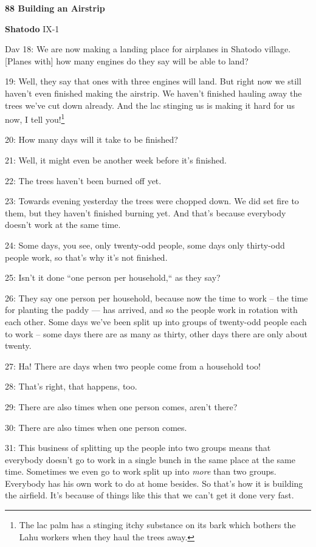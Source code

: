 
\textbf{88 Building an Airstrip }

\textbf{Shatodo} IX-1

Dav 18: We are now making a landing place for airplanes in Shatodo village. [Planes
with] how many engines do they say will be able to land?

19: Well, they say that ones with three engines will land. But right now we still
haven't even finished making the airstrip. We haven't finished hauling away the
trees we've cut down already. And the lac stinging us is making it hard for us
now, I tell you!\footnote{The lac palm has a stinging itchy substance on its bark which bothers the Lahu workers when they haul the trees away.}

20: How many days will it take to be finished?

21: Well, it might even be another week before it's finished.

22: The trees haven't been burned off yet.

23: Towards evening yesterday the trees were chopped down. We did set fire to them,
but they haven't finished burning yet. And that's because everybody doesn't work
at the same time.

24: Some days, you see, only twenty-odd people, some days only thirty-odd people
work, so that's why it's not finished.

25: Isn't it done ``one person per household,`` as they say?

26: They say one person per household, because now the time to work -- the time
for planting the paddy --- has arrived, and so the people work in rotation with
each other. Some days we've been split up into groups of twenty-odd people each
to work -- some days there are as many as thirty, other days there are only about
twenty.

27: Ha! There are days when two people come from a household too!

28: That's right, that happens, too.

29: There are also times when one person comes, aren't there?

30: There are also times when one person comes.

31: This business of splitting up the people into two groups means that everybody
doesn't go to work in a single bunch in the same place at the same time. Sometimes
we even go to work split up into \textit{more} than two groups. Everybody has his
own work to do at home besides. So that's how it is building the airfield. It's
because of things like this that we can't get it done very fast.


